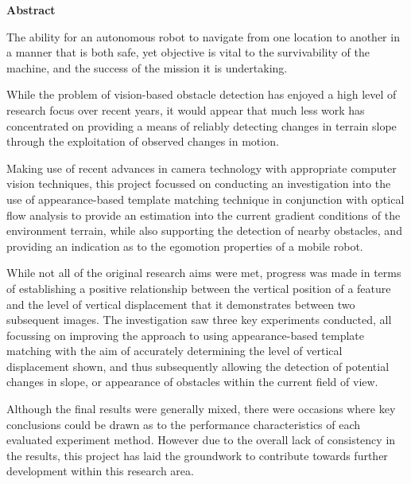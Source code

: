 \thispagestyle{empty}

\begin{center}
    {\LARGE\bf Abstract}
\end{center}


The ability for an autonomous robot to navigate from one location to another in a manner that is both safe, yet objective is vital to the survivability of the machine, and the success of the mission it is undertaking. 


While the problem of vision-based obstacle detection has enjoyed a high level of research focus over recent years, it would appear that much less work has concentrated on providing a means of reliably detecting changes in terrain slope through the exploitation of observed changes in motion.

Making use of recent advances in camera technology with appropriate computer vision techniques, this project focussed on conducting an investigation into the use of appearance-based template matching technique in conjunction with optical flow analysis to provide an estimation into the current gradient conditions of the environment terrain, while also supporting the detection of nearby obstacles, and providing an indication as to the egomotion properties of a mobile robot.

While not all of the original research aims were met, progress was made in terms of establishing a positive relationship between the vertical position of a feature and the level of vertical displacement that it demonstrates between two subsequent images. The investigation saw three key experiments conducted, all focussing on improving the approach to using appearance-based template matching with the aim of accurately determining the level of vertical displacement shown, and thus subsequently allowing the detection of potential changes in slope, or appearance of obstacles within the current field of view.

Although the final results were generally mixed, there were occasions where key conclusions could be drawn as to the performance characteristics of each evaluated experiment method. However due to the overall lack of consistency in the results, this project has laid the groundwork to contribute towards further development within this research area.


